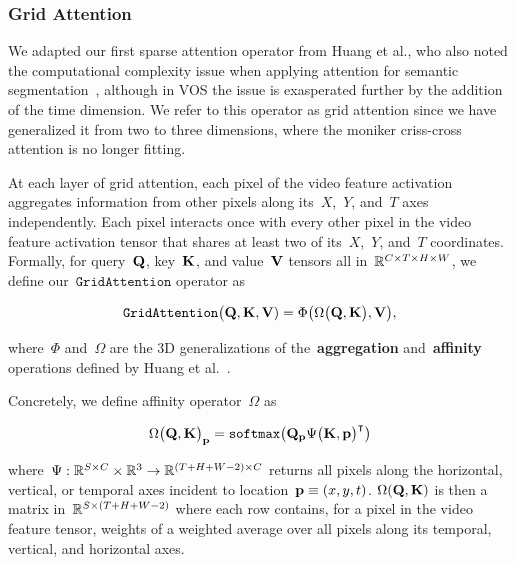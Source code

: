 \subsubsection{Grid Attention}

We adapted our first sparse attention operator from Huang et al., who also
noted the computational complexity issue when applying attention for semantic
segmentation~\cite{huang2018ccnet}, although in VOS the issue is exasperated
further by the addition of the time dimension.
We refer to this operator as grid attention since we have generalized it from
two to three dimensions, where the moniker criss-cross attention is no longer
fitting.

At each layer of grid attention, each pixel of the video feature activation
aggregates information from other pixels along its~$X$,~$Y$, and~$T$ axes
independently.
Each pixel interacts once with every other pixel in the video feature
activation tensor that shares at least two of its~$X$,~$Y$, and~$T$
coordinates.
Formally, for query~$\mathbf{Q}{}$, key~$\mathbf{K}{}$, and
value~$\mathbf{V}{}$ tensors all in~$\mathbb{R}{}^{C\times T\times H\times W}$, we
define our~$\mathtt{GridAttention}$ operator as

\begin{equation}
\mathtt{GridAttention}{\big(\mathbf{Q}{}, \mathbf{K}{}, \mathbf{V}{})} = \Phi\big(\Omega\big(\mathbf{Q}{}, \mathbf{K}{}\big), \mathbf{V}{}\big),
\label{eqn:gridattndefn}
\end{equation}

where~$\Phi$ and~$\Omega$ are the 3D generalizations of
the~\textbf{aggregation} and~\textbf{affinity} operations defined by Huang et
al.~\cite{huang2018ccnet}.

Concretely, we define affinity operator~$\Omega$ as

\begin{equation}
        {\Omega\big(\mathbf{Q}{}, \mathbf{K}{}\big)}_{\mathbf{p}}{} = \mathtt{softmax}{}\big(\mathbf{Q}{}_{\mathbf{p}}{} {\Psi\big(\mathbf{K}{}, \mathbf{p}{}\big)}^\intercal\big)
\label{eqn:gridattndefn}
\end{equation}

where~$\Psi : \mathbb{R}{}^{S\times C} \times \mathbb{R}{}^3 \rightarrow \mathbb{R}{}^{(T + H + W - 2)\times C}$
returns all pixels along the horizontal, vertical, or temporal axes incident to
location~$\mathbf{p}{} \equiv (x, y, t)$.
$\Omega(\mathbf{Q}{}, \mathbf{K}{})$ is then a matrix
in~$\mathbb{R}{}^{S\times (T + H + W - 2)}$ where each row contains, for a pixel in
the video feature tensor, weights of a weighted average over all pixels along
its temporal, vertical, and horizontal axes.

